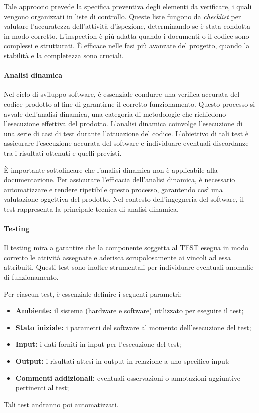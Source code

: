 Tale approccio prevede la specifica preventiva degli elementi da verificare, i quali vengono organizzati in liste di controllo.
Queste liste fungono da \textit{checklist} per valutare l'accuratezza dell'attività d'ispezione, determinando se è stata condotta in modo corretto.
L'inspection è più adatta quando i documenti o il codice sono complessi e strutturati. È efficace nelle fasi più avanzate del progetto, quando la stabilità e la completezza sono cruciali. 

\paragraph*{Analisi dinamica}
Nel ciclo di sviluppo software, è essenziale condurre una verifica accurata del codice prodotto al fine di garantirne il corretto funzionamento. Questo processo si avvale dell'analisi dinamica, una categoria di metodologie che richiedono l'esecuzione effettiva del prodotto. 
L'analisi dinamica coinvolge l'esecuzione di una serie di casi di test durante l'attuazione del codice. L'obiettivo di tali test è assicurare l'esecuzione accurata del software e individuare eventuali discordanze tra i risultati ottenuti e quelli previsti. 

È importante sottolineare che l'analisi dinamica non è applicabile alla documentazione.
Per assicurare l'efficacia dell'analisi dinamica, è necessario automatizzare e rendere ripetibile questo processo, garantendo così una valutazione oggettiva del prodotto. Nel contesto dell'ingegneria del software, il test rappresenta la principale tecnica di analisi dinamica. 

\paragraph{Testing}
Il testing mira a garantire che la componente soggetta al TEST esegua in modo corretto le attività assegnate e aderisca scrupolosamente ai vincoli ad essa attribuiti. Questi test sono inoltre strumentali per individuare eventuali anomalie di funzionamento. 

Per ciascun test, è essenziale definire i seguenti parametri: 

\begin{itemize}
    \item \textbf{Ambiente:} 
        il sistema (hardware e software) utilizzato per eseguire il test;
    \item \textbf{Stato iniziale:} 
        i parametri del software al momento dell'esecuzione del test;
    \item \textbf{Input:} 
        i dati forniti in input per l'esecuzione del test;
    \item \textbf{Output:} 
        i risultati attesi in output in relazione a uno specifico input;
    \item \textbf{Commenti addizionali:} 
        eventuali osservazioni o annotazioni aggiuntive pertinenti al test;
\end{itemize}
Tali test andranno poi automatizzati. 


